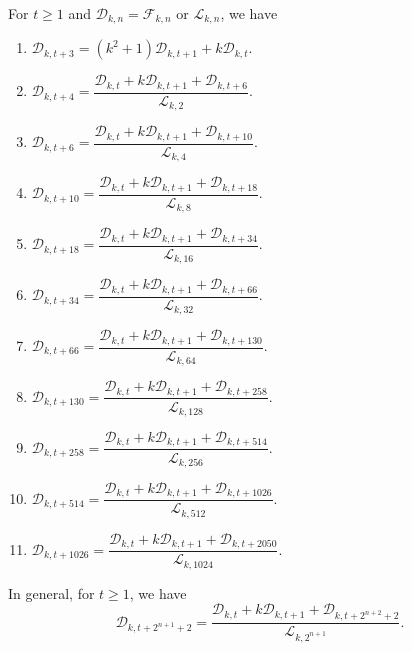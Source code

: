 \begin{theorem}For $t\geq 1$ and $\mathcal{D}_{k,n}=\mathcal{F}_{k,n}$ or $\mathcal{L}_{k,n}$, we have\label{3.5}
\begin{enumerate}
\item $\mathcal{D}_{k,t+3}=(k^2+1)\mathcal{D}_{k,t+1}+k\mathcal{D}_{k,t}$.
\item $\mathcal{D}_{k,t+4}=\dfrac{\mathcal{D}_{k,t}+k\mathcal{D}_{k,t+1}+\mathcal{D}_{k,t+6}}{\mathcal{L}_{k,2}}$.
\item $\mathcal{D}_{k,t+6}=\dfrac{\mathcal{D}_{k,t}+k\mathcal{D}_{k,t+1}+\mathcal{D}_{k,t+10}}{\mathcal{L}_{k,4}}$.
\item $\mathcal{D}_{k,t+10}=\dfrac{\mathcal{D}_{k,t}+k\mathcal{D}_{k,t+1}+\mathcal{D}_{k,t+18}}{\mathcal{L}_{k,8}}$.
\item $\mathcal{D}_{k,t+18}=\dfrac{\mathcal{D}_{k,t}+k\mathcal{D}_{k,t+1}+\mathcal{D}_{k,t+34}}{\mathcal{L}_{k,16}}$.
\item $\mathcal{D}_{k,t+34}=\dfrac{\mathcal{D}_{k,t}+k\mathcal{D}_{k,t+1}+\mathcal{D}_{k,t+66}}{\mathcal{L}_{k,32}}$.
\item $\mathcal{D}_{k,t+66}=\dfrac{\mathcal{D}_{k,t}+k\mathcal{D}_{k,t+1}+\mathcal{D}_{k,t+130}}{\mathcal{L}_{k,64}}$.
\item $\mathcal{D}_{k,t+130}=\dfrac{\mathcal{D}_{k,t}+k\mathcal{D}_{k,t+1}+\mathcal{D}_{k,t+258}}{\mathcal{L}_{k,128}}$.
\item $\mathcal{D}_{k,t+258}=\dfrac{\mathcal{D}_{k,t}+k\mathcal{D}_{k,t+1}+\mathcal{D}_{k,t+514}}{\mathcal{L}_{k,256}}$.
\item $\mathcal{D}_{k,t+514}=\dfrac{\mathcal{D}_{k,t}+k\mathcal{D}_{k,t+1}+\mathcal{D}_{k,t+1026}}{\mathcal{L}_{k,512}}$.
\item $\mathcal{D}_{k,t+1026}=\dfrac{\mathcal{D}_{k,t}+k\mathcal{D}_{k,t+1}+\mathcal{D}_{k,t+2050}}{\mathcal{L}_{k,1024}}$.
\end{enumerate}
In general, for $ t\geq 1$, we have
$$\mathcal{D}_{k,t+2^{n+1}+2}=\dfrac{\mathcal{D}_{k,t}+k\mathcal{D}_{k,t+1}+\mathcal{D}_{k,t+2^{n+2}+2}}{\mathcal{L}_{k,2^{n+1}}}.$$
\end{theorem}
